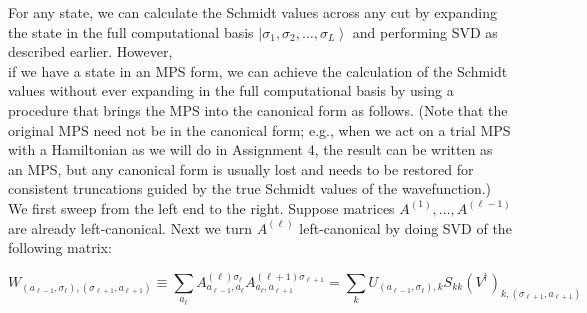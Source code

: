 \documentclass[12pt]{article}
\begin{document}
For any state, we can calculate the Schmidt values across any cut by expanding the state in the full computational basis $\left|\sigma_{1}, \sigma_{2}, \ldots, \sigma_{L}\right\rangle$ and performing SVD as described earlier. However,\\
if we have a state in an MPS form, we can achieve the calculation of the Schmidt values without ever expanding in the full computational basis by using a procedure that brings the MPS into the canonical form as follows. (Note that the original MPS need not be in the canonical form; e.g., when we act on a trial MPS with a Hamiltonian as we will do in Assignment 4, the result can be written as an MPS, but any canonical form is usually lost and needs to be restored for consistent truncations guided by the true Schmidt values of the wavefunction.) We first sweep from the left end to the right. Suppose matrices $A^{(1)}, \ldots, A^{(\ell-1)}$ are already left-canonical. Next we turn $A^{(\ell)}$ left-canonical by doing SVD of the following matrix:


\begin{equation*}
W_{\left(a_{\ell-1}, \sigma_{\ell}\right),\left(\sigma_{\ell+1}, a_{\ell+1}\right)} \equiv \sum_{a_{\ell}} A_{a_{\ell-1}, a_{\ell}}^{(\ell) \sigma_{\ell}} A_{a_{\ell}, a_{\ell+1}}^{(\ell+1) \sigma_{\ell+1}}=\sum_{k} U_{\left(a_{\ell-1}, \sigma_{\ell}\right), k} S_{k k}\left(V^{\dagger}\right)_{k,\left(\sigma_{\ell+1}, a_{\ell+1}\right)} \tag{25}
\end{equation*}
\end{document}
